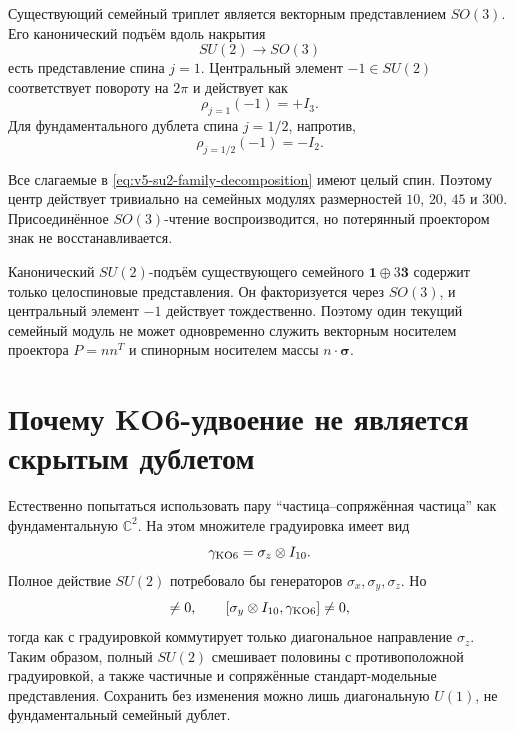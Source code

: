 Существующий семейный триплет является векторным представлением
$SO(3)$. Его канонический подъём вдоль накрытия
\begin{equation}
 SU(2)\longrightarrow SO(3)
\end{equation}
есть представление спина $j=1$. Центральный элемент $-1\in SU(2)$
соответствует повороту на $2\pi$ и действует как
\begin{equation}
 \rho_{j=1}(-1)=+I_3.
 \label{eq:v5-su2-spin-one-center}
\end{equation}
Для фундаментального дублета спина $j=1/2$, напротив,
\begin{equation}
 \rho_{j=1/2}(-1)=-I_2.
 \label{eq:v5-su2-spin-half-center}
\end{equation}

Все слагаемые в \eqref{eq:v5-su2-family-decomposition} имеют целый спин.
Поэтому центр действует тривиально на семейных модулях размерностей $10$,
$20$, $45$ и $300$. Присоединённое $SO(3)$-чтение воспроизводится, но
потерянный проектором знак не восстанавливается.

\begin{theorem}
Канонический $SU(2)$-подъём существующего семейного
$\mathbf 1\oplus3\mathbf 3$ содержит только целоспиновые представления.
Он факторизуется через $SO(3)$, и центральный элемент $-1$ действует
тождественно. Поэтому один текущий семейный модуль не может одновременно
служить векторным носителем проектора $P=nn^T$ и спинорным носителем
массы $n\cdot\boldsymbol\sigma$.
\end{theorem}

\section{Почему KO6-удвоение не является скрытым дублетом}

Естественно попытаться использовать пару ``частица--сопряжённая частица''
как фундаментальную $\mathbb C^2$. На этом множителе градуировка имеет вид
\begin{equation}
 \gamma_{\rm KO6}=\sigma_z\otimes I_{10}.
\end{equation}
Полное действие $SU(2)$ потребовало бы генераторов
$\sigma_x,\sigma_y,\sigma_z$. Но
\begin{equation}
 [\sigma_x\otimes I_{10},\gamma_{\rm KO6}]\ne0,
 \qquad
 [\sigma_y\otimes I_{10},\gamma_{\rm KO6}]\ne0,
\end{equation}
тогда как с градуировкой коммутирует только диагональное направление
$\sigma_z$. Таким образом, полный $SU(2)$ смешивает половины с
противоположной градуировкой, а также частичные и сопряжённые
стандарт-модельные представления. Сохранить без изменения можно лишь
диагональную $U(1)$, не фундаментальный семейный дублет.

